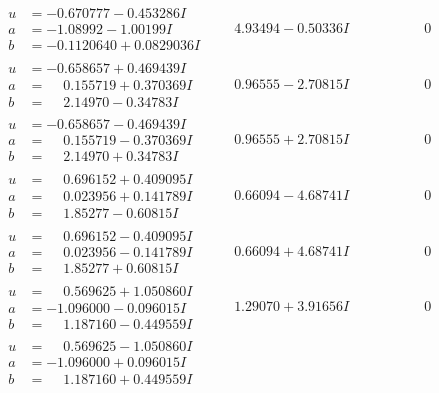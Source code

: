 \documentclass[1p]{elsarticle_modified}
\theoremstyle{definition}
\begin{document}
$$\begin{array}{c|c|c}
\begin{aligned}
u &= -0.670777 - 0.453286 I \\
a &= -1.08992 - 1.00199 I \\
b &= -0.1120640 + 0.0829036 I\end{aligned}
 & \phantom{-}4.93494 - 0.50336 I & \phantom{-0.000000 } 0 \\ \hline\begin{aligned}
u &= -0.658657 + 0.469439 I \\
a &= \phantom{-}0.155719 + 0.370369 I \\
b &= \phantom{-}2.14970 - 0.34783 I\end{aligned}
 & \phantom{-}0.96555 - 2.70815 I & \phantom{-0.000000 } 0 \\ \hline\begin{aligned}
u &= -0.658657 - 0.469439 I \\
a &= \phantom{-}0.155719 - 0.370369 I \\
b &= \phantom{-}2.14970 + 0.34783 I\end{aligned}
 & \phantom{-}0.96555 + 2.70815 I & \phantom{-0.000000 } 0 \\ \hline\begin{aligned}
u &= \phantom{-}0.696152 + 0.409095 I \\
a &= \phantom{-}0.023956 + 0.141789 I \\
b &= \phantom{-}1.85277 - 0.60815 I\end{aligned}
 & \phantom{-}0.66094 - 4.68741 I & \phantom{-0.000000 } 0 \\ \hline\begin{aligned}
u &= \phantom{-}0.696152 - 0.409095 I \\
a &= \phantom{-}0.023956 - 0.141789 I \\
b &= \phantom{-}1.85277 + 0.60815 I\end{aligned}
 & \phantom{-}0.66094 + 4.68741 I & \phantom{-0.000000 } 0 \\ \hline\begin{aligned}
u &= \phantom{-}0.569625 + 1.050860 I \\
a &= -1.096000 - 0.096015 I \\
b &= \phantom{-}1.187160 - 0.449559 I\end{aligned}
 & \phantom{-}1.29070 + 3.91656 I & \phantom{-0.000000 } 0 \\ \hline\begin{aligned}
u &= \phantom{-}0.569625 - 1.050860 I \\
a &= -1.096000 + 0.096015 I \\
b &= \phantom{-}1.187160 + 0.449559 I\end{aligned}

\end{array}$$
\end{document}
